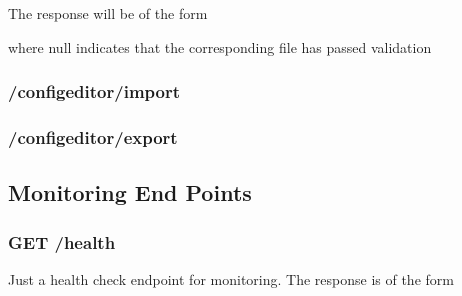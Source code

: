 The response will be of the form

\begin{Shaded}
\begin{Highlighting}[]
\FunctionTok{\{}
    \FunctionTok{:}\FunctionTok{,}
    \FunctionTok{:}\FunctionTok{,}
    \FunctionTok{:}\FunctionTok{,}
\FunctionTok{\}}
\end{Highlighting}
\end{Shaded}

where null indicates that the corresponding file has passed validation

\hypertarget{configeditorimport}{%
\subsubsection{/configeditor/import}\label{configeditorimport}}

\hypertarget{configeditorexport}{%
\subsubsection{/configeditor/export}\label{configeditorexport}}

\hypertarget{monitoring-end-points}{%
\subsection{Monitoring End Points}\label{monitoring-end-points}}

\hypertarget{get-health}{%
\subsubsection{GET /health}\label{get-health}}

Just a health check endpoint for monitoring. The response is of the form

\begin{Shaded}
\begin{Highlighting}[]
\FunctionTok{\{}
    \FunctionTok{:} \FunctionTok{,} 
    \FunctionTok{:} \FunctionTok{,} 
    \FunctionTok{:} \FunctionTok{,} 
    \FunctionTok{:} \FunctionTok{\{}
        \FunctionTok{:} \FunctionTok{\{}
            \FunctionTok{:} \FunctionTok{,} 
            \FunctionTok{:} \FunctionTok{,} 
            \FunctionTok{:} 
        \FunctionTok{\}}
    \FunctionTok{\}}
\FunctionTok{\}}
\end{Highlighting}
\end{Shaded}


